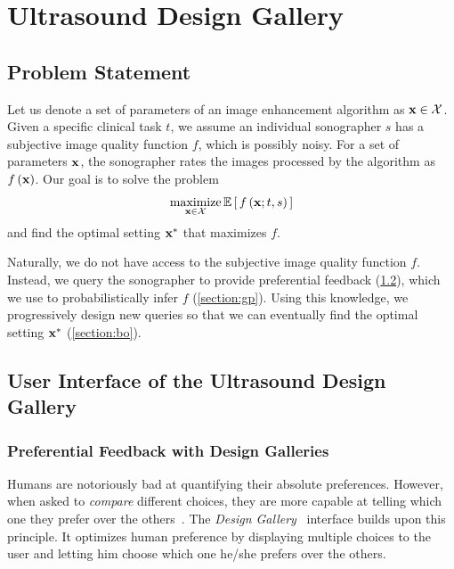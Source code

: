 
\section{Ultrasound Design Gallery}\label{section:usdg}


\subsection{Problem Statement}
Let us denote a set of parameters of an image enhancement algorithm as \(\mathbf{x} \in \mathcal{X}\).
Given a specific clinical task \(t\), we assume an individual sonographer \(s\) has a subjective image quality function \(f\), which is possibly noisy.
For a set of parameters \(\mathbf{x}\), the sonographer rates the images processed by the algorithm as \(f\left(\mathbf{x}\right)\).
Our goal is to solve the problem
%
\begin{align}
  \operatorname*{maximize}_{\mathbf{x} \in \mathcal{X}} \mathbb{E}\left[\,f\left(\mathbf{x}; t, s \right)\,\right]
\end{align}
%
and find the optimal setting \(\mathbf{x}^*\) that maximizes \(f\).

Naturally, we do not have access to the subjective image quality function \(f\).
Instead, we query the sonographer to provide preferential feedback (\cref{section:ui}), which we use to probabilistically infer \(f\) (\cref{section:gp}).
Using this knowledge, we progressively design new queries so that we can eventually find the optimal setting \(\mathbf{x}^*\) (\cref{section:bo}).

\subsection{User Interface of the Ultrasound Design Gallery}\label{section:ui}
\subsubsection{Preferential Feedback with Design Galleries}
Humans are notoriously bad at quantifying their absolute preferences.
However, when asked to \textit{compare} different choices, they are more capable at telling which one they prefer over the others~\cite{10.2307/27821441, NIPS2007_b6a1085a}.
The \textit{Design Gallery}~\cite{10.1145/258734.258887} interface builds upon this principle.
It optimizes human preference by displaying multiple choices to the user and letting him choose which one he/she prefers over the others.

